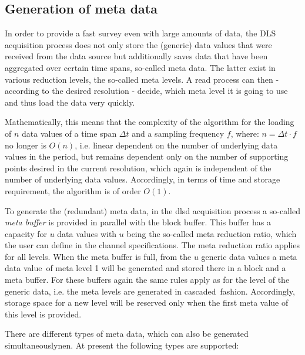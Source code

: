 \documentclass[a4paper,12pt,BCOR6mm,bibtotoc,idxtotoc]{scrbook}
\begin{document}

\subsection{Generation of meta data} \label{sec:dlsd_data_meta}

In order to provide a fast survey even with large amounts of data, the DLS acquisition process does not only store the (\glqq generic\grqq) data values that were received from the data source but additionally saves data that have been aggregated over certain time spans, so-called \glqq meta data\grqq{}. The latter exist in various reduction levels, the so-called \glqq meta levels\grqq. A read process can then - according to the desired resolution - decide, which meta level it is going to use and thus load the data very quickly.

Mathematically, this means that the complexity of the algorithm for the loading of $n$ data values of a time span $\Delta t$ and a sampling frequency $f$, where: $n = \Delta t \cdot f$ no longer is $O(n)$, i.e. linear dependent on the number of underlying data values in the period, but remains dependent only on the number of supporting points desired in the current resolution, which again is independent of the number of underlying data values. Accordingly, in terms of time and storage requirement, the algorithm is of order $O(1)$.

To generate the (redundant) meta data, in the dlsd acquisition process a so-called \textit{meta buffer} is provided in parallel with the block buffer. This buffer has a capacity for $u$ data values with $u$ being the so-called meta reduction ratio, which the user can define in the channel specifications. The meta reduction ratio applies for all levels. When the meta buffer is full, from the $u$ generic data values a \glqq meta data value\grqq\  of meta level 1 will be generated and stored there in a block and a meta buffer. For these buffers again the same rules apply as for the level of the generic data, i.e. the meta levels are generated in \glqq cascaded\grqq\  fashion. Accordingly, storage space for a new level will be reserved only when the first meta value of this level is provided.

There are different types of meta data, which can also be generated simultaneously\-nen.  At present the following types are supported:
\end{document}
